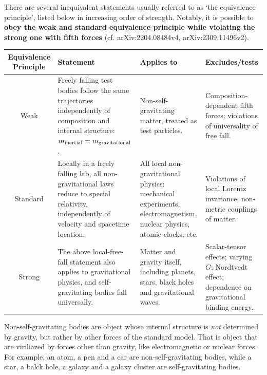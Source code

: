 \documentclass[../geometry_main.tex]{subfiles}
\begin{document}
\begin{mytheorem}
There are several inequivalent statements usually referred to as `the equivalence principle', listed below in increasing order of strength.
Notably, it is possible to \textbf{obey the weak and standard equivalence principle while violating the strong one with fifth forces} (cf. arXiv:2204.08484v4, 	arXiv:2309.11496v2).
{\scriptsize
\begin{center}
\setlength{\tabcolsep}{3pt}
\renewcommand{\arraystretch}{1.15}
\begin{tabular}{c|p{}|p{}|p{}}
\textbf{Equivalence Principle} & \textbf{Statement} & \textbf{Applies to} & \textbf{Excludes/tests} \\
\hline
Weak
&
Freely falling test bodies follow the same trajectories independently of composition and internal structure: \(m_{\rm inertial}=m_{\rm gravitational}\).
&
Non-self-gravitating matter,  treated as test particles.
&
Composition-dependent fifth forces; violations of universality of free fall.
\\
\hline
Standard
&
Locally in a freely falling lab, all non-gravitational laws reduce to special relativity, independently of velocity and spacetime location.
&
All local non-gravitational physics: mechanical experiments, electromagnetism, nuclear physics, atomic clocks, etc.
&
Violations of local Lorentz invariance; non-metric couplings of matter.
\\
\hline
Strong
&
The above local-free-fall statement also applies to gravitational physics, and self-gravitating bodies fall universally.
&
Matter and gravity itself, including planets, stars, black holes and gravitational waves.
&
Scalar-tensor effects; varying \(G\); Nordtvedt effect; dependence on gravitational binding energy.
\end{tabular}
\end{center}}
%
Non-self-gravitating bodies are object whose internal structure is \emph{not} determined by gravity, but rather by other forces of the standard model. That is object that are viriliazed by forces other than gravity, like electromagnetic or nuclear forces.
For example, an atom, a pen and a car are non-self-gravitating bodies, while a star, a balck hole, a galaxy and a galaxy cluster are self-gravitating bodies.
\end{mytheorem}
\end{document}
